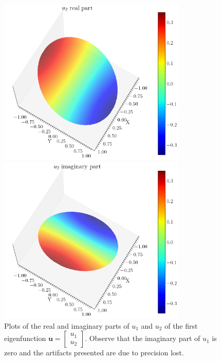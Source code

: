 \begin{figure}[!htb]
    \begin{minipage}[b]{0.45\textwidth}
        \centering
        \includegraphics[width=0.8\textwidth]{Images/Dirac/circle_m_0_u2_re_points_158_inner_eta_05.png}
    \end{minipage}
    \hfill
    \begin{minipage}[b]{0.45\textwidth}
        \centering
        \includegraphics[width=0.8\textwidth]{Images/Dirac/circle_m_0_u2_im_points_158_inner_eta_05.png}
    \end{minipage}
    \caption{Plots of the real and imaginary parts of \(u_1\) and \(u_2\) of the first eigenfunction \(\mathbf{u}=\begin{bmatrix} u_1\\ u_2 \end{bmatrix}\). Observe that the imaginary part of \(u_1\) is zero and the artifacts presented are due to precision lost.}
    \label{dirac_disk_plots_m0}
\end{figure}




